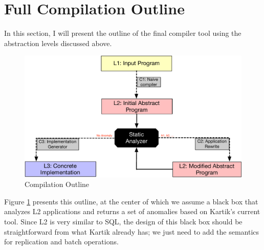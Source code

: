 \documentclass[12pt,letter]{article}
\begin{document}
\section {Full Compilation Outline}
In this section, I will present the outline of the final compiler tool
using the abstraction levels discussed above.
\begin{figure}[t]
\begin{center}
\includegraphics[width=\textwidth]{figures/outline.pdf}
\end{center}
\caption {Compilation Outline}
\label{fig:outline}
\end{figure}
Figure \ref{fig:outline} presents this outline, at the center of which we assume a
black box that analyzes L2 applications and returns a set of anomalies based on
Kartik's current tool. Since L2 is very similar to SQL, 
the design of this black box should be straightforward from what Kartik
already has; we just need to add the semantics for replication and batch
operations. 
\end{document}
